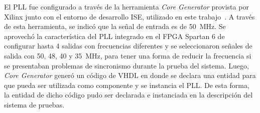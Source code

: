		El PLL fue configurado a través de la herramienta {\it Core Generator} provista por Xilinx junto con el entorno de desarrollo ISE, utilizado en este trabajo~\cite{XilinxInc}. A través de esta herramienta, se indicó que la señal de entrada es de \SI{50}{\mega\hertz}. Se aprovechó la característica del PLL integrado en el FPGA Spartan 6 de configurar hasta 4 salidas con frecuencias diferentes y se seleccionaron señales de salida con \si{50}, \si{48}, \si{40} y \SI{35}{\mega\hertz}, para tener una forma de reducir la frecuencia si se presentaban problemas de sincronismo durante la prueba del sistema. Luego, {\it Core Generator} generó un código de VHDL en donde se declara una entidad para que pueda ser utilizada como componente y se instancia el PLL. De esta forma, la entidad de dicho código pudo ser declarada e instanciada en la descripción del sistema de pruebas.
		
%		
%	
		
		
%	
		
